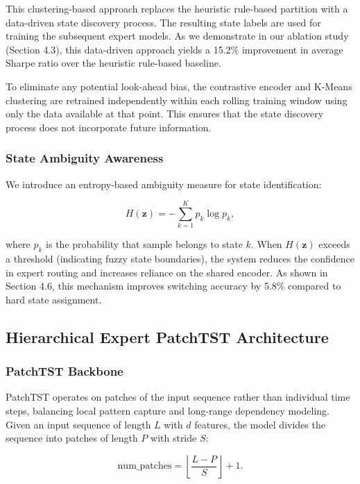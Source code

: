 \documentclass[review]{elsarticle}
\begin{document}
This clustering-based approach replaces the heuristic rule-based partition with a data-driven state discovery process. The resulting state labels are used for training the subsequent expert models. As we demonstrate in our ablation study (Section 4.3), this data-driven approach yields a 15.2\% improvement in average Sharpe ratio over the heuristic rule-based baseline.

To eliminate any potential look-ahead bias, the contrastive encoder and K-Means clustering are retrained independently within each rolling training window using only the data available at that point. This ensures that the state discovery process does not incorporate future information.

\subsubsection{State Ambiguity Awareness}

We introduce an entropy-based ambiguity measure for state identification:

\begin{equation}
H(\mathbf{z}) = -\sum_{k=1}^{K} p_k \log p_k,
\end{equation}

where $p_k$ is the probability that sample belongs to state $k$. When $H(\mathbf{z})$ exceeds a threshold (indicating fuzzy state boundaries), the system reduces the confidence in expert routing and increases reliance on the shared encoder. As shown in Section 4.6, this mechanism improves switching accuracy by 5.8\% compared to hard state assignment.

\subsection{Hierarchical Expert PatchTST Architecture}

\subsubsection{PatchTST Backbone}

PatchTST \citep{nie2023patchtst} operates on patches of the input sequence rather than individual time steps, balancing local pattern capture and long-range dependency modeling. Given an input sequence of length $L$ with $d$ features, the model divides the sequence into patches of length $P$ with stride $S$:

\begin{equation}
\text{num\_patches} = \left\lfloor \frac{L - P}{S} \right\rfloor + 1.
\end{equation}
\end{document}
